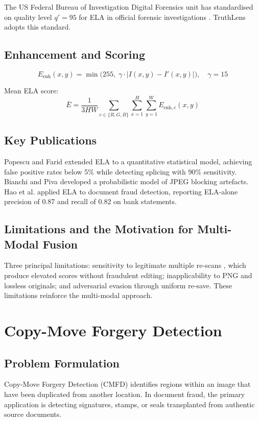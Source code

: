 \documentclass[12pt,a4paper,oneside]{report}
\begin{document}
The US Federal Bureau of Investigation Digital Forensics unit has standardised
on quality level $q'=95$ for ELA in official forensic investigations \cite{farid2009}.
TruthLens adopts this standard.

\subsection{Enhancement and Scoring}

\[E_{\text{enh}}(x,y) = \min\bigl(255,\;\gamma\cdot|I(x,y)-I'(x,y)|\bigr),\quad \gamma=15\]

Mean ELA score:
\[\bar{E} = \frac{1}{3HW}\sum_{c\in\{R,G,B\}}\sum_{x=1}^{H}\sum_{y=1}^{W}E_{\text{enh},c}(x,y)\]

\subsection{Key Publications}

Popescu and Farid \cite{popescu2004} extended ELA to a quantitative statistical
model, achieving false positive rates below 5\% while detecting splicing with
90\% sensitivity. Bianchi and Piva \cite{bianchi2012} developed a probabilistic
model of JPEG blocking artefacts. Hao et al. \cite{hao2019} applied ELA to
document fraud detection, reporting ELA-alone precision of 0.87 and recall of
0.82 on bank statements.

\subsection{Limitations and the Motivation for Multi-Modal Fusion}

Three principal limitations: sensitivity to legitimate multiple re-scans
\cite{johnson2007}, which produce elevated scores without fraudulent editing;
inapplicability to PNG and lossless originals; and adversarial evasion through
uniform re-save. These limitations reinforce the multi-modal approach.

\section{Copy-Move Forgery Detection}
\label{sec:cmfd_lit}

\subsection{Problem Formulation}

Copy-Move Forgery Detection (CMFD) identifies regions within an image that
have been duplicated from another location. In document fraud, the primary
application is detecting signatures, stamps, or seals transplanted from
authentic source documents.
\end{document}
